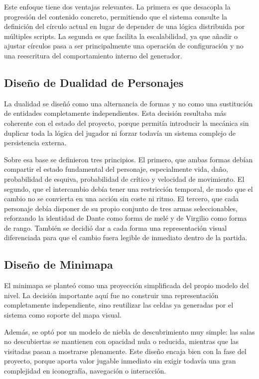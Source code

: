 Este enfoque tiene dos ventajas relevantes. La primera es que desacopla la progresión del
contenido concreto, permitiendo que el sistema consulte la definición del círculo actual en
lugar de depender de una lógica distribuida por múltiples scripts. La segunda es que
facilita la escalabilidad, ya que añadir o ajustar círculos pasa a ser principalmente una
operación de configuración y no una reescritura del comportamiento interno del generador.

\subsection{Diseño de Dualidad de Personajes}
La dualidad se diseñó como una alternancia de formas y no como una sustitución de entidades
completamente independientes. Esta decisión resultaba más coherente con el estado del
proyecto, porque permitía introducir la mecánica sin duplicar toda la lógica del jugador ni
forzar todavía un sistema complejo de persistencia externa.

Sobre esa base se definieron tres principios. El primero, que ambas formas debían compartir
el estado fundamental del personaje, especialmente vida, daño, probabilidad de esquiva,
probabilidad de crítico y velocidad de movimiento. El segundo, que el intercambio debía
tener una restricción temporal, de modo que el cambio no se convierta en una acción sin
coste ni ritmo. El tercero, que cada personaje debía disponer de su propio conjunto de tres
armas seleccionables, reforzando la identidad de Dante como forma de melé y de Virgilio como
forma de rango. También se decidió dar a cada forma una representación visual diferenciada
para que el cambio fuera legible de inmediato dentro de la partida.

\subsection{Diseño de Minimapa}
El minimapa se planteó como una proyección simplificada del propio modelo del nivel. La
decisión importante aquí fue no construir una representación completamente independiente,
sino reutilizar las celdas ya generadas por el sistema como soporte del mapa visual.

Además, se optó por un modelo de niebla de descubrimiento muy simple: las salas no
descubiertas se mantienen con opacidad nula o reducida, mientras que las visitadas pasan a
mostrarse plenamente. Este diseño encaja bien con la fase del proyecto, porque aporta valor
jugable inmediato sin exigir todavía una gran complejidad en iconografía, navegación o
interacción.

